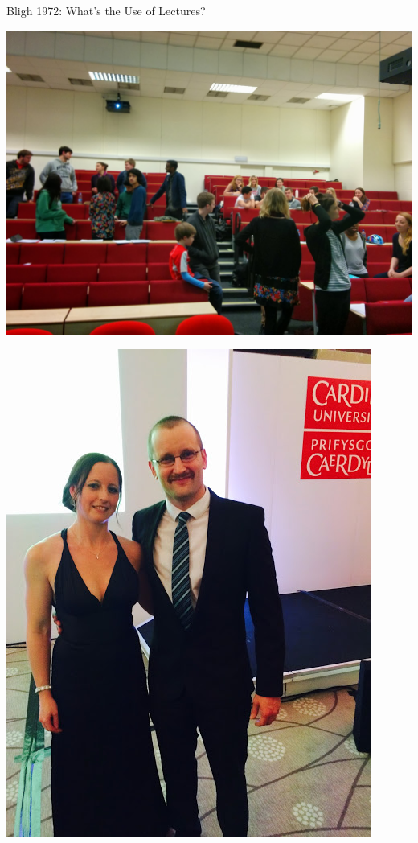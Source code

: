 \documentclass{beamer}
\begin{document}
    \begin{frame}
            Bligh 1972: What's the Use of Lectures?
    \end{frame}

    \begin{frame}
        \begin{center}
            \includegraphics[width=.8\textwidth]{../2016-07-07-What-is-the-lecture-for/img/class_meeting.jpg}
        \end{center}
    \end{frame}

    \begin{frame}
        \begin{center}
            \includegraphics[height=.8\textheight]{../2015-07-22-My-experience-of-pcutl/prize.jpg}
        \end{center}
    \end{frame}
\end{document}
